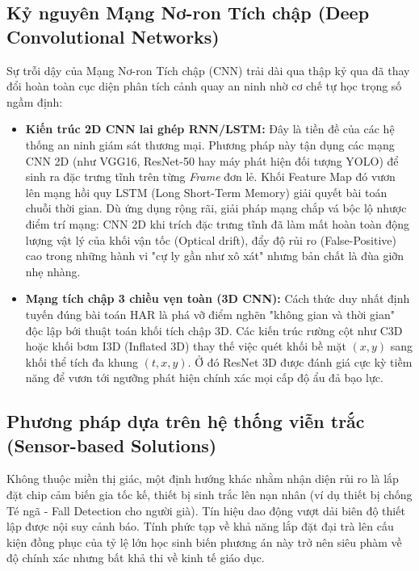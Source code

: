 \documentclass[conference]{IEEEtran}
\begin{document}
\subsection{Kỷ nguyên Mạng Nơ-ron Tích chập (Deep Convolutional Networks)}
Sự trỗi dậy của Mạng Nơ-ron Tích chập (CNN) trải dài qua thập kỷ qua đã thay đổi hoàn toàn cục diện phân tích cảnh quay an ninh nhờ cơ chế tự học trọng số ngầm định:
\begin{itemize}
    \item \textbf{Kiến trúc 2D CNN lai ghép RNN/LSTM:} Đây là tiền đề của các hệ thống an ninh giám sát thương mại. Phương pháp này tận dụng các mạng CNN 2D (như VGG16, ResNet-50 hay máy phát hiện đối tượng YOLO) để sinh ra đặc trưng tĩnh trên từng \textit{Frame} đơn lẻ. Khối Feature Map đó vươn lên mạng hồi quy LSTM (Long Short-Term Memory) giải quyết bài toán chuỗi thời gian. Dù ứng dụng rộng rãi, giải pháp mạng chắp vá bộc lộ nhược điểm trí mạng: CNN 2D khi trích đặc trưng tĩnh đã làm mất hoàn toàn động lượng vật lý của khối vận tốc (Optical drift), đẩy độ rủi ro (False-Positive) cao trong những hành vi "cự ly gần như xô xát" nhưng bản chất là đùa giỡn nhẹ nhàng.
    \item \textbf{Mạng tích chập 3 chiều vẹn toàn (3D CNN):} Cách thức duy nhất định tuyến đúng bài toán HAR là phá vỡ điểm nghẽn "không gian và thời gian" độc lập bới thuật toán khối tích chập 3D. Các kiến trúc rường cột như C3D hoặc khối bơm I3D (Inflated 3D) thay thế việc quét khối bề mặt $(x, y)$ sang khối thể tích đa khung $(t, x, y)$. Ở đó ResNet 3D được đánh giá cực kỳ tiềm năng để vươn tới ngưỡng phát hiện chính xác mọi cấp độ ẩu đả bạo lực.
\end{itemize}

\subsection{Phương pháp dựa trên hệ thống viễn trắc (Sensor-based Solutions)}
Không thuộc miền thị giác, một định hướng khác nhằm nhận diện rủi ro là lắp đặt chip cảm biến gia tốc kế, thiết bị sinh trắc lên nạn nhân (ví dụ thiết bị chống Té ngã - Fall Detection cho người già). Tín hiệu dao động vượt dải biên độ thiết lập được nội suy cảnh báo. Tính phức tạp về khả năng lắp đặt đại trà lên cấu kiện đồng phục của tỷ lệ lớn học sinh biến phương án này trở nên siêu phàm về độ chính xác nhưng bất khả thi về kinh tế giáo dục.
\end{document}
